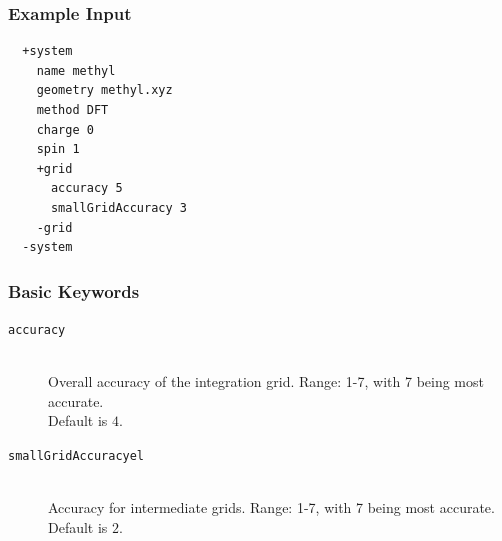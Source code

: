 \documentclass[bibliography=totocnumbered,a4paper,10pt,oneside]{scrbook}
\begin{document}
\subsubsection{Example Input}
\begin{lstlisting}
  +system
    name methyl
    geometry methyl.xyz
    method DFT
    charge 0
    spin 1
    +grid
      accuracy 5
      smallGridAccuracy 3
    -grid
  -system
 \end{lstlisting}
\subsubsection{Basic Keywords}
\begin{description}
  \item [\texttt{accuracy}]\hfill \\
  Overall accuracy of the integration grid. Range: 1-7, with 7 being most accurate.\\ Default is $4$.
 \item [\texttt{smallGridAccuracyel}]\hfill \\
 Accuracy for intermediate grids. Range: 1-7, with 7 being most accurate. Default is $2$.
\end{description}
\end{document}
